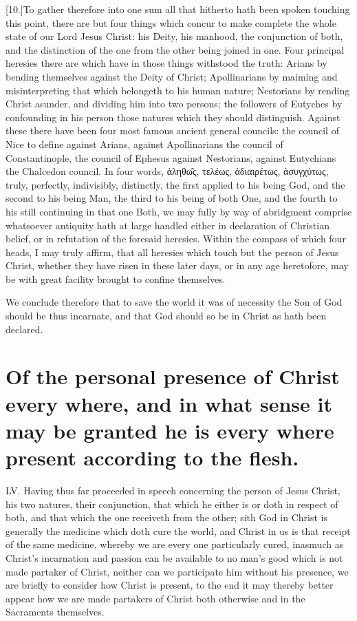 [10.]To gather therefore into one sum all that hitherto hath been spoken touching this point, there are but four things which concur to make complete the whole state of our Lord Jesus Christ: his Deity, his manhood, the conjunction of both, and the distinction of the one from the other being joined in one. Four principal heresies there are which have in those things withstood the truth: Arians by bending themselves against the Deity of Christ; Apollinarians by maiming and misinterpreting that which belongeth to his human nature; Nestorians by rending Christ asunder, and  dividing him into two persons; the followers of Eutyches by confounding in his person those natures which they should distinguish.
 Against these there have been four most famous ancient general councils: the council of Nice to define against Arians, against Apollinarians the council of Constantinople, the council of Ephesus against Nestorians, against Eutychians the Chalcedon council. In four words, ἀληθω̑ς, τελέως, ἀδιαιρέτως, ἀσυγχύτως, truly, perfectly, indivisibly, distinctly, the first applied to his being God, and the second to his being Man, the third to his being of both One, and the fourth to his still continuing in that one Both, we may fully by way of abridgment comprise whatsoever antiquity hath at large handled either in declaration of Christian belief, or in refutation of the foresaid heresies. Within the compass of which four heads, I may truly affirm, that all heresies which touch but the person of Jesus Christ, whether they have risen in these later days, or in any age heretofore, may be with great facility brought to confine themselves.

We conclude therefore that to save the world it was of necessity the Son of God should be thus incarnate, and that God should so be in Christ as hath been declared.


\section*{Of the personal presence of Christ every where, and in what sense it may be granted he is every where present according to the flesh.}
LV. Having thus far proceeded in speech concerning the person of Jesus Christ, his two natures, their conjunction, that which he either is or doth in respect of both, and that which the one receiveth from the other; sith God in Christ is generally the medicine which doth cure the world, and Christ in us is that receipt of the same medicine, whereby we are every one particularly cured, inasmuch as Christ’s incarnation and passion can be available to no man’s good which is not made partaker of Christ, neither can we participate him without his presence, we are briefly to consider how Christ is present, to the end it may thereby better appear how we are made partakers of Christ both otherwise and in the Sacraments themselves.

